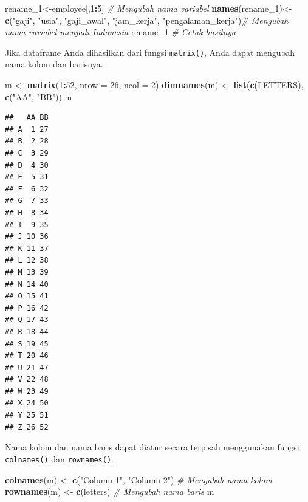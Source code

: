 \documentclass[
]{book}
\newenvironment{Shaded}{\begin{snugshade}}{\end{snugshade}}
\newcommand{\AttributeTok}[1]{\textcolor[rgb]{0.13,0.29,0.53}{#1}}
\newcommand{\CommentTok}[1]{\textcolor[rgb]{0.56,0.35,0.01}{\textit{#1}}}
\newcommand{\DecValTok}[1]{\textcolor[rgb]{0.00,0.00,0.81}{#1}}
\newcommand{\FunctionTok}[1]{\textcolor[rgb]{0.13,0.29,0.53}{\textbf{#1}}}
\newcommand{\NormalTok}[1]{#1}
\newcommand{\OtherTok}[1]{\textcolor[rgb]{0.56,0.35,0.01}{#1}}
\newcommand{\SpecialCharTok}[1]{\textcolor[rgb]{0.81,0.36,0.00}{\textbf{#1}}}
\newcommand{\StringTok}[1]{\textcolor[rgb]{0.31,0.60,0.02}{#1}}
\begin{document}
\begin{Shaded}
\begin{Highlighting}[]
\NormalTok{rename\_1}\OtherTok{\textless{}{-}}\NormalTok{employee[,}\DecValTok{1}\SpecialCharTok{:}\DecValTok{5}\NormalTok{]               }\CommentTok{\# Mengubah nama variabel}
\FunctionTok{names}\NormalTok{(rename\_1)}\OtherTok{\textless{}{-}}\FunctionTok{c}\NormalTok{(}\StringTok{"gaji"}\NormalTok{, }
                    \StringTok{"usia"}\NormalTok{,}
                    \StringTok{"gaji\_awal"}\NormalTok{,}
                    \StringTok{"jam\_kerja"}\NormalTok{,}
                    \StringTok{"pengalaman\_kerja"}\NormalTok{)}\CommentTok{\# Mengubah nama variabel menjadi Indonesia}
\NormalTok{rename\_1                               }\CommentTok{\# Cetak hasilnya}
\end{Highlighting}
\end{Shaded}

Jika dataframe Anda dihasilkan dari fungsi \texttt{matrix()}, Anda dapat mengubah nama kolom dan barisnya.

\begin{Shaded}
\begin{Highlighting}[]
\NormalTok{m }\OtherTok{\textless{}{-}} \FunctionTok{matrix}\NormalTok{(}\DecValTok{1}\SpecialCharTok{:}\DecValTok{52}\NormalTok{, }\AttributeTok{nrow =} \DecValTok{26}\NormalTok{, }\AttributeTok{ncol =} \DecValTok{2}\NormalTok{)}
\FunctionTok{dimnames}\NormalTok{(m) }\OtherTok{\textless{}{-}} \FunctionTok{list}\NormalTok{(}\FunctionTok{c}\NormalTok{(LETTERS), }\FunctionTok{c}\NormalTok{(}\StringTok{"AA"}\NormalTok{, }\StringTok{"BB"}\NormalTok{)) }
\NormalTok{m}
\end{Highlighting}
\end{Shaded}

\begin{verbatim}
##   AA BB
## A  1 27
## B  2 28
## C  3 29
## D  4 30
## E  5 31
## F  6 32
## G  7 33
## H  8 34
## I  9 35
## J 10 36
## K 11 37
## L 12 38
## M 13 39
## N 14 40
## O 15 41
## P 16 42
## Q 17 43
## R 18 44
## S 19 45
## T 20 46
## U 21 47
## V 22 48
## W 23 49
## X 24 50
## Y 25 51
## Z 26 52
\end{verbatim}

Nama kolom dan nama baris dapat diatur secara terpisah menggunakan fungsi \texttt{colnames()} dan \texttt{rownames()}.

\begin{Shaded}
\begin{Highlighting}[]
\FunctionTok{colnames}\NormalTok{(m) }\OtherTok{\textless{}{-}} \FunctionTok{c}\NormalTok{(}\StringTok{"Column 1"}\NormalTok{, }\StringTok{"Column 2"}\NormalTok{) }\CommentTok{\# Mengubah nama kolom}
\FunctionTok{rownames}\NormalTok{(m) }\OtherTok{\textless{}{-}} \FunctionTok{c}\NormalTok{(letters)                }\CommentTok{\# Mengubah nama baris}
\NormalTok{m}
\end{Highlighting}
\end{Shaded}
\end{document}
